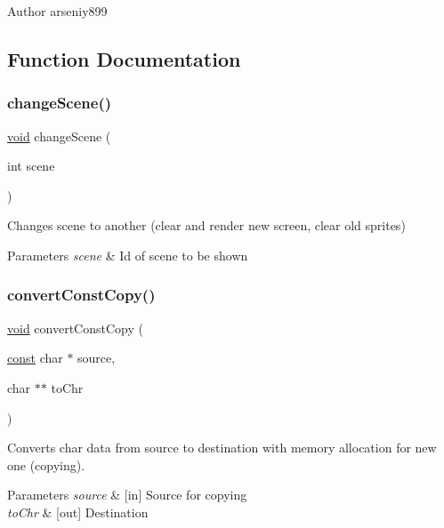 \begin{DoxyAuthor}{Author}
arseniy899 
\end{DoxyAuthor}


\subsection{Function Documentation}
\mbox{\label{group___core_ga02ff5c3ae037f5e07455e6e31faa8012}} 
\subsubsection{\texorpdfstring{change\+Scene()}{changeScene()}}
{\footnotesize\ttfamily \hyperlink{png_8h_ac9c84fa68bbad002983e35ce3663c686}{void} change\+Scene (\begin{DoxyParamCaption}\item[{int}]{scene }\end{DoxyParamCaption})}

Changes scene to another (clear and render new screen, clear old sprites) 
\begin{DoxyParams}{Parameters}
{\em scene} & Id of scene to be shown \\
\hline
\end{DoxyParams}
\mbox{\label{group___core_ga408edec4092671024a17603aebcc9225}} 
\subsubsection{\texorpdfstring{convert\+Const\+Copy()}{convertConstCopy()}}
{\footnotesize\ttfamily \hyperlink{png_8h_ac9c84fa68bbad002983e35ce3663c686}{void} convert\+Const\+Copy (\begin{DoxyParamCaption}\item[{\hyperlink{zconf_8h_a2c212835823e3c54a8ab6d95c652660e}{const} char $\ast$}]{source,  }\item[{char $\ast$$\ast$}]{to\+Chr }\end{DoxyParamCaption})}

Converts char data from source to destination with memory allocation for new one (copying). 
\begin{DoxyParams}{Parameters}
{\em source} & \mbox{[}in\mbox{]} Source for copying \\
\hline
{\em to\+Chr} & \mbox{[}out\mbox{]} Destination \\
\hline
\end{DoxyParams}
\mbox{\label{group___core_gac66e8a197a47d63d439a2b34a23d1444}} 
